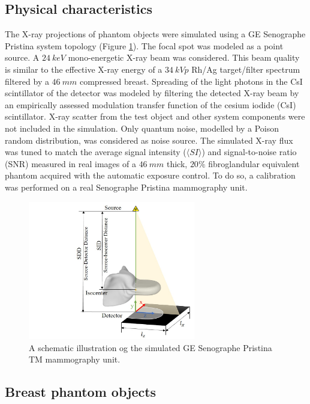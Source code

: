 \subsection{Physical characteristics}
The X-ray projections of phantom objects were simulated using a GE Senographe Pristina system topology (Figure \ref{fig:systemgeometry}). The focal spot was modeled as a point source. A $24\ keV$ mono-energetic X-ray beam was considered.  This beam quality is similar to the effective X-ray energy of a $34\ kVp$ Rh/Ag target/filter spectrum filtered by a $46\ mm$ compressed breast. Spreading of the light photons in the CsI scintillator of the detector was modeled by filtering the detected X-ray beam by an empirically assessed modulation transfer function of the cesium iodide (CsI) scintillator. X-ray scatter from the test object and other system components were not included in the simulation. Only quantum noise, modelled by a Poison random distribution, was considered as noise source. The simulated X-ray flux was tuned to match the average signal intensity ($\langle SI \rangle$) and signal-to-noise ratio (SNR) measured in real images of a $46\ mm$ thick, $20\%$ fibroglandular equivalent phantom acquired with the automatic exposure control. To do so, a calibration was performed on a real Senographe Pristina mammography unit.


\begin{figure}[!h]
\centering
\includegraphics[width=0.65\textwidth,keepaspectratio]{figures/systemgeometry.jpg} 
\caption{A schematic illustration og the simulated GE Senographe Pristina TM mammography unit.}
\label{fig:systemgeometry}
\end{figure}

\subsection{Breast phantom objects}

